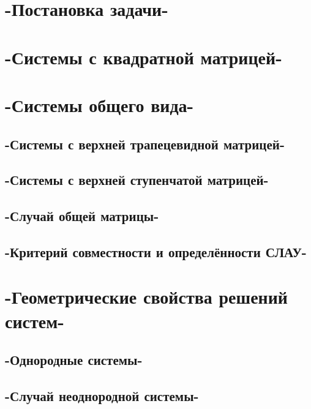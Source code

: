 \chapter{-Постановка задачи-}
\chapter{-Системы с квадратной матрицей-}
\chapter{-Системы общего вида-}
\section{-Системы с верхней трапецевидной матрицей-}
\section{-Системы с верхней ступенчатой матрицей-}
\section{-Случай общей матрицы-}
\section{-Критерий совместности и определённости СЛАУ-}
\chapter{-Геометрические свойства решений систем-}
\section{-Однородные системы-}
\section{-Случай неоднородной системы-}
